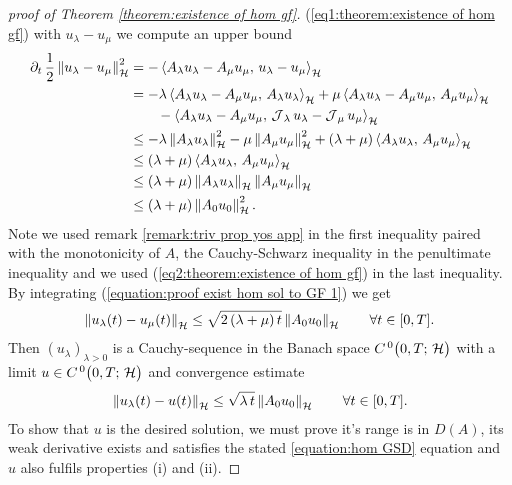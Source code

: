 \begin{proof}[proof of Theorem \ref{theorem:existence of hom gf}]
	(\ref{eq1:theorem:existence of hom gf}) 
	with $ u_\lambda-u_\mu $ we compute an upper bound
	\begin{align}\label{equation:proof exist hom sol to GF 1}
		\begin{split}
			\partial_t\, \frac{1}{2}\left\Vert u_\lambda-u_\mu\right\Vert_{\mathcal{H}}^2
			&=-\left\langle A_\lambda u_\lambda-A_\mu u_\mu,\,u_\lambda-u_\mu\right\rangle_{\mathcal{H}}\\
			&=-\lambda \left\langle A_\lambda u_\lambda-A_\mu u_\mu,\,A_\lambda u_\lambda\right\rangle_{\mathcal{H}}
			+\mu \left\langle A_\lambda u_\lambda-A_\mu u_\mu,\,A_\mu u_\mu\right\rangle_{\mathcal{H}}\\
			&\qquad	-\left\langle A_\lambda u_\lambda-A_\mu u_\mu,\,\operatorname{\mathcal{J}}_\lambda u_\lambda-\operatorname{\mathcal{J}}_\mu u_\mu\right\rangle_{\mathcal{H}}\\
			&\leq -\lambda \left\Vert A_\lambda u_\lambda\right\Vert_{\mathcal{H}}^2
			-\mu \left\Vert A_\mu u_\mu\right\Vert_{\mathcal{H}}^2
			+(\lambda+\mu)\left\langle A_\lambda u_\lambda,\,A_\mu u_\mu\right\rangle_{\mathcal{H}}\\
			&\leq (\lambda+\mu)\left\langle A_\lambda u_\lambda,\,A_\mu u_\mu\right\rangle_{\mathcal{H}}\\
			&\leq (\lambda+\mu)\left\Vert A_\lambda u_\lambda\right\Vert_{\mathcal{H}}\left\Vert A_\mu u_\mu\right\Vert_{\mathcal{H}}\\
			&\leq (\lambda+\mu)\left\Vert A_0 u_0\right\Vert_{\mathcal{H}}^2.
		\end{split}
	\end{align}
	Note we used remark \ref{remark:triv prop yos app} in the first inequality
	paired with the monotonicity of $ A $,
	the Cauchy-Schwarz inequality in the penultimate inequality and 
	we used (\ref{eq2:theorem:existence of hom gf}) in the last inequality.
	By integrating (\ref{equation:proof exist hom sol to GF 1}) we get
	\begin{align*}
		\left\Vert u_\lambda(t)-u_\mu(t)\right\Vert_{\mathcal{H}}
		\leq \sqrt{2\,(\lambda + \mu)\,t}\left\Vert A_0 u_0\right\Vert_{\mathcal{H}}
		\qquad\forall t\in[0,T].
	\end{align*}
	Then $ (u_\lambda)_{\lambda>0} $ is a Cauchy-sequence
	in the Banach space $ C^{\, 0}\big(0,T;\,\mathcal{H}\big) $ with a limit 
	$ u\in C^{\, 0}\big(0,T;\,\mathcal{H}\big) $ and convergence estimate
	\begin{align}\label{eq3:theorem:existence of hom gf}
		\left\Vert u_\lambda(t)-u(t)\right\Vert_{\mathcal{H}}
		\leq \sqrt{\lambda\, t}\left\Vert A_0 u_0\right\Vert_{\mathcal{H}}
		\qquad\forall t\in[0,T].
	\end{align}
	To show that $ u $ is the desired solution, we must
	prove it's range is in $ D(A) $, its weak derivative exists
	and satisfies the stated \ref{equation:hom GSD} 
	equation and $ u $ also fulfils properties (i) and (ii).\smallskip
	

\end{proof}
